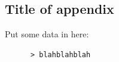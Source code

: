 \documentclass{l4proj}
\begin{document}














\begin{appendices}

\chapter{Title of appendix}
Put some data in here:
\begin{verbatim}
      > blahblahblah
\end{verbatim}

\end{appendices}




\end{document}
